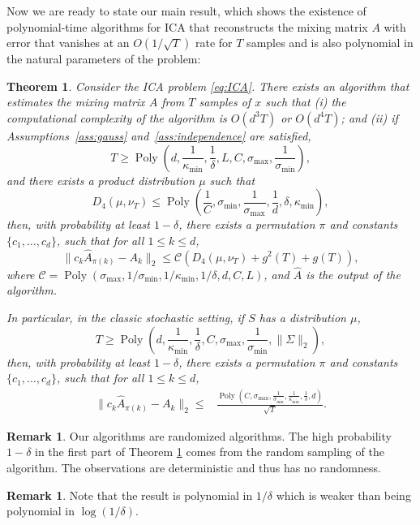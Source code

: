 \documentclass[jmlr]{article}
\DeclareMathOperator{\pol}{Poly}
\newcommand{\poly}[1]{\pol\left(#1\right)}
\newtheorem{thm}[lemma]{Theorem}
\theoremstyle{definition}
\newtheorem{remark}[lemma]{Remark}
\begin{document}
Now we are ready to state our main result, which shows the existence of polynomial-time algorithms for ICA that reconstructs the mixing matrix $A$ 
with error that vanishes at an $O(1/\sqrt{T})$ rate for $T$ samples and is also polynomial in the natural parameters of the problem:


\begin{thm}
\label{thm:finalRes} Consider the ICA problem \eqref{eq:ICA}. There exists an algorithm that estimates the mixing matrix $A$ from $T$ samples of $x$ such that (i) the computational complexity of the algorithm is $O(d^3 T)$ or $O(d^4 T)$; and (ii) if Assumptions~\ref{ass:gauss} and~\ref{ass:independence} are satisfied,
\[
T \ge \poly{d, \frac{1}{\kappa_{\min}}, \frac{1}{\delta}, L, C, \sigma_{\max}, \frac{1}{\sigma_{\min}}},
\]
and there exists a product distribution  $\mu$  such that 
\[
D_4(\mu, \nu_T) \le \poly{\frac{1}{C},  \sigma_{\min},  \frac{1}{\sigma_{\max}},\frac{1}{d}, \delta, \kappa_{\min}},
\]
then, with probability at least $1-\delta$, there exists a permutation $\pi$ and constants $\{c_1,\ldots,c_d\}$, such that for all $1\le k\le d$,
\[
\| c_k\hat{A}_{\pi(k)} - A_k\|_2 \le \mathcal{C}\left(D_4(\mu, \nu_T)+g^2(T)+g(T)\right),
\]
where $\mathcal{C} = \poly{\sigma_{\max}, 1/\sigma_{\min}, 1/\kappa_{\min},1/\delta, d, C, L}$, and $\hat{A}$ is the output of the algorithm.

In particular, in the classic stochastic setting, if $S$ has a distribution $\mu$, 
\[
T \ge \poly{d, \frac{1}{\kappa_{\min}}, \frac{1}{\delta}, C, \sigma_{\max}, \frac{1}{\sigma_{\min}}, \|\Sigma\|_2},
\]
then, with probability at least $1-\delta$, there exists a permutation $\pi$ and constants $\{c_1,\ldots,c_d\}$, such that for all $1\le k\le d$,
\begin{align*}
 \| c_k\hat{A}_{\pi(k)} - A_k\|_2 \le 
& \frac{\poly{C, \sigma_{\max}, \frac{1}{\sigma_{\min}}, \frac{1}{\kappa_{\min}},\frac{1}{\delta}, d}}{\sqrt{T}}.
\end{align*}
\end{thm}
\begin{remark}
Our algorithms are randomized algorithms. The high probability $1-\delta$ in the first part of Theorem \ref{thm:finalRes} comes from the random sampling of the algorithm. The observations are deterministic and thus has no randomness. 
\end{remark}
\begin{remark} %
Note that the result is polynomial in $1/\delta$ which is weaker than being polynomial in $\log(1/\delta)$.
\end{remark}
\end{document}
